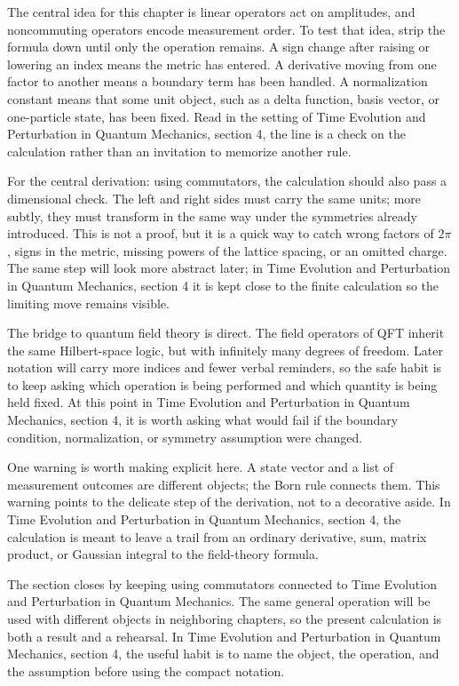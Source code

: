 The central idea for this chapter is linear operators act on amplitudes, and noncommuting operators encode measurement order.  To test that idea, strip the formula down until only the operation remains.  A sign change after raising or lowering an index means the metric has entered.  A derivative moving from one factor to another means a boundary term has been handled.  A normalization constant means that some unit object, such as a delta function, basis vector, or one-particle state, has been fixed.  Read in the setting of Time Evolution and Perturbation in Quantum Mechanics, section 4, the line is a check on the calculation rather than an invitation to memorize another rule.

For the central derivation: using commutators, the calculation should also pass a dimensional check.  The left and right sides must carry the same units; more subtly, they must transform in the same way under the symmetries already introduced.  This is not a proof, but it is a quick way to catch wrong factors of \(2\pi\), signs in the metric, missing powers of the lattice spacing, or an omitted charge.  The same step will look more abstract later; in Time Evolution and Perturbation in Quantum Mechanics, section 4 it is kept close to the finite calculation so the limiting move remains visible.

The bridge to quantum field theory is direct.  The field operators of QFT inherit the same Hilbert-space logic, but with infinitely many degrees of freedom.  Later notation will carry more indices and fewer verbal reminders, so the safe habit is to keep asking which operation is being performed and which quantity is being held fixed.  At this point in Time Evolution and Perturbation in Quantum Mechanics, section 4, it is worth asking what would fail if the boundary condition, normalization, or symmetry assumption were changed.

One warning is worth making explicit here.  A state vector and a list of measurement outcomes are different objects; the Born rule connects them.  This warning points to the delicate step of the derivation, not to a decorative aside.  In Time Evolution and Perturbation in Quantum Mechanics, section 4, the calculation is meant to leave a trail from an ordinary derivative, sum, matrix product, or Gaussian integral to the field-theory formula.

The section closes by keeping using commutators connected to Time Evolution and Perturbation in Quantum Mechanics.  The same general operation will be used with different objects in neighboring chapters, so the present calculation is both a result and a rehearsal.  In Time Evolution and Perturbation in Quantum Mechanics, section 4, the useful habit is to name the object, the operation, and the assumption before using the compact notation.



